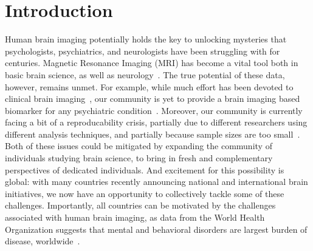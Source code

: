 \documentclass[11pt]{article}
\begin{document}



\section{Introduction}

Human brain imaging potentially holds the key to unlocking mysteries that psychologists, psychiatrics, and neurologists have been struggling with for centuries.  Magnetic Resonance Imaging (MRI) has become a vital tool both in basic brain science, as well as neurology~\cite{}.  The true potential of these data, however, remains unmet.  For example, while much effort has been devoted to clinical brain imaging~\cite{}, our community is yet to provide a brain imaging based biomarker for any psychiatric condition~\cite{}.  Moreover, our community is currently facing a bit of a reproducability crisis, partially due to different researchers using different analysis techniques, and partially because sample sizes are too small~\cite{}.  Both of these issues could be mitigated by expanding the community of individuals studying brain science, to bring in fresh and complementary perspectives of dedicated individuals.  And excitement for this possibility is global: with many countries recently announcing national and international brain initiatives, we now have an opportunity to collectively tackle some of these challenges.  Importantly, all countries can be motivated by the challenges associated with human brain imaging, as data from the World Health Organization suggests that mental and behavioral disorders are largest burden of disease, worldwide~\cite{Whiteford13, Vigo16}.
\end{document}
